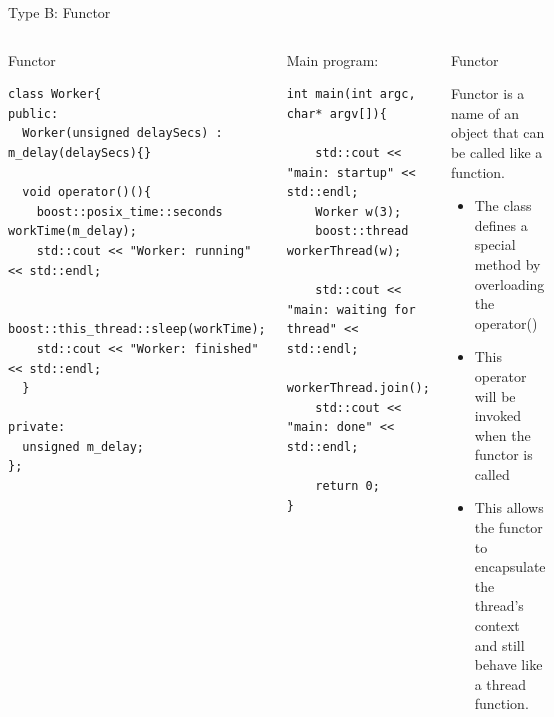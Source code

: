 \documentclass[8pt]{beamer}
\begin{document}
\begin{frame}[fragile]{Type B: Functor}
 
\vspace{-15px}
\begin{columns}
 
\begin{exampleblock}{Functor}

\begin{lstlisting}
class Worker{
public:
  Worker(unsigned delaySecs) : m_delay(delaySecs){}

  void operator()(){
    boost::posix_time::seconds workTime(m_delay);
    std::cout << "Worker: running" << std::endl;
  
    boost::this_thread::sleep(workTime);
    std::cout << "Worker: finished" << std::endl;
  }
    
private:
  unsigned m_delay;
};
\end{lstlisting}

\end{exampleblock}
\vspace{-8px} 
\begin{exampleblock}{Main program:}

\begin{lstlisting}
int main(int argc, char* argv[]){

    std::cout << "main: startup" << std::endl;
    Worker w(3);
    boost::thread workerThread(w);

    std::cout << "main: waiting for thread" << std::endl;
    workerThread.join();
    std::cout << "main: done" << std::endl;

    return 0;
}
\end{lstlisting}

\end{exampleblock}
 

\begin{block}{Functor}

Functor is a name of an object that can be called like a function.

\begin{itemize}
  \item The class defines a special method by overloading the operator() 
  \item This operator will be invoked when the functor is called
  \item This allows the functor to encapsulate the thread’s context and still behave like a thread function.
\end{itemize}


\end{block}
\end{columns}
\end{frame}
\end{document}
